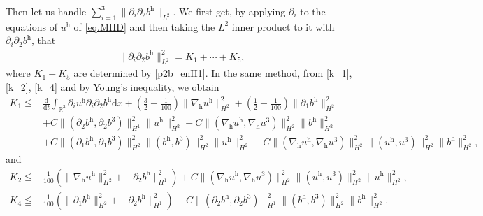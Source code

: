 \documentclass[11pt]{amsart}
\theoremstyle{definition}
\newcommand{\R}{\mathbb{R}}
\newcommand{\h}{\mathrm{h}}
\newcommand{\nablah}{\nabla_{\mathrm{h}}}
\numberwithin{equation}{section}
\begin{document}
Then let us handle $\sum_{i=1}^3\|\partial_i\partial_2b^\h\|_{L^2}$.
We first get, by applying $\partial_{i}$ to the equations of  $u^\mathrm{h}$ of \eqref{eq.MHD} and then taking the $L^2$ inner product to it with $\partial_{i}\partial_{2}b^\mathrm{h}$, that
\begin{align}\label{p2bh_enH1}
	\|\partial_{i}\partial_{2}b^\mathrm{h}\|_{L^2}^2=K_1+\cdots+K_5,
\end{align}
where $K_1-K_{5}$ are determined by \eqref{p2b_enH1}. In the same method, from \eqref{k_1}, \eqref{k_2}, \eqref{k_4} and by Young's inequality, we obtain
\begin{align}\label{K1h}
	K_{1}
	\leqq&\frac{\mathrm{d}}{\mathrm{d}t}\int_{\R^3}\partial_{i}u^\h\partial_{i}\partial_{2}b^\h\mathrm{d}x+(\frac32+\frac{1}{100})\|\nablah u^\h\|_{H^2}^2+(\frac12+\frac{1}{100})\|\partial_1 b^\h\|_{H^2}^2\nonumber\\
	&+C\|(\partial_2b^\mathrm{h},\partial_2b^3)\|_{H^{1}}^2\|u^\h\|_{H^{2}}^2+C\|(\nabla_{\mathrm{h}}u^\h,\nabla_{\mathrm{h}}u^3)\|_{H^{2}}^2\|b^\h\|_{H^{2}}^2\nonumber\\
	&+C\|(\partial_1b^\h,\partial_1b^3)\|_{H^2}^2\|(b^\h,b^3)\|_{H^2}^2\|u^\h\|_{H^2}^2+C\|(\nablah u^\h,\nablah u^3)\|_{H^2}^2\|(u^\h,u^3)\|_{H^2}^2\|b^\h\|_{H^2}^2,
\end{align}
and
\begin{align}\label{K2h}
	K_2
	\leqq &\frac{1}{100}\left(\|\nablah u^\h\|_{H^2}^2+\|\partial_{2}b^\h\|_{H^1}^2\right)+C\|(\nablah u^\h,\nablah u^3)\|_{H^2}^2\|( u^\h, u^3)\|_{H^2}^2\| u^\h \|_{H^2}^2,\\\label{K4h}
	K_4
	\leqq &\frac{1}{100}\left(\|\partial_1 b^\h\|_{H^2}^2+\|\partial_{2}b^\h\|_{H^1}^2\right)+C\|(\partial_2 b^\h,\partial_2 b^3)\|_{H^1}^2\|( b^\h, b^3)\|_{H^2}^2\| b^\h \|_{H^2}^2.
\end{align}
\end{document}
